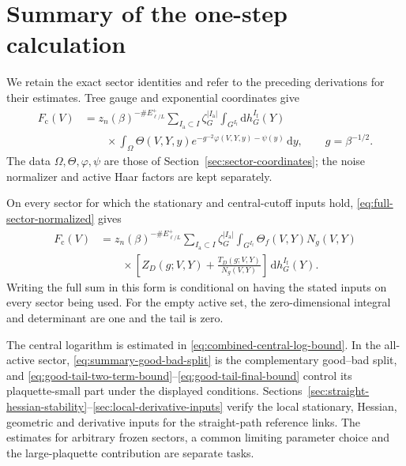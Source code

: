 \documentclass[10pt,reqno]{amsart}
\theoremstyle{definition}
\theoremstyle{remark}
\numberwithin{equation}{section}
\numberwithin{figure}{section}
\newcommand{\dd}{\mathrm d}
\newcommand{\Ia}{I_{\mathrm a}}
\newcommand{\If}{I_{\mathrm f}}
\newcommand{\Fc}{F_{\mathrm c}}
\begin{document}
\section{Summary of the one-step calculation}\label{sec:one-step-summary}
We retain the exact sector identities and refer to the preceding
derivations for their estimates. Tree gauge and exponential coordinates
give
\begin{equation}\label{eq:summary-exact-sector-sum}
\begin{aligned}
\Fc(V)
&=z_n(\beta)^{-\#E_{\ell/L}^+}
\sum_{\Ia\subset I}\zeta_G^{|\Ia|}
\int_{G^{\If}}\dd h_G^{\If}(Y)\\
&\qquad\times\int_\Omega
\Theta(V,Y,y)e^{-g^{-2}\varphi(V,Y,y)-\psi(y)}\,\dd y,
\qquad g=\beta^{-1/2}.
\end{aligned}
\end{equation}
The data $\Omega,\Theta,\varphi,\psi$ are those of
Section~\ref{sec:sector-coordinates}; the noise normalizer and active
Haar factors are kept separately.

On every sector for which the stationary and central-cutoff inputs
hold, \eqref{eq:full-sector-normalized} gives
\begin{equation}\label{eq:summary-normalized-reassembly}
\begin{aligned}
\Fc(V)
&=z_n(\beta)^{-\#E_{\ell/L}^+}
\sum_{\Ia\subset I}\zeta_G^{|\Ia|}
\int_{G^{\If}}\Theta_f(V,Y)N_g(V,Y)\\
&\qquad\times\left[Z_D(g;V,Y)
+\frac{T_D(g;V,Y)}{N_g(V,Y)}\right]\,\dd h_G^{\If}(Y).
\end{aligned}
\end{equation}
Writing the full sum in this form is conditional on having the stated
inputs on every sector being used. For the empty active set, the
zero-dimensional integral and determinant are one and the tail is zero.

The central logarithm is estimated in
\eqref{eq:combined-central-log-bound}. In the all-active sector,
\eqref{eq:summary-good-bad-split} is the complementary good--bad split,
and \eqref{eq:good-tail-two-term-bound}--\eqref{eq:good-tail-final-bound}
control its plaquette-small part under the displayed conditions.
Sections~\ref{sec:straight-hessian-stability}--\ref{sec:local-derivative-inputs}
verify the local stationary, Hessian, geometric and derivative inputs
for the straight-path reference links. The estimates for arbitrary
frozen sectors, a common limiting parameter choice and the
large-plaquette contribution are separate tasks.
\end{document}
